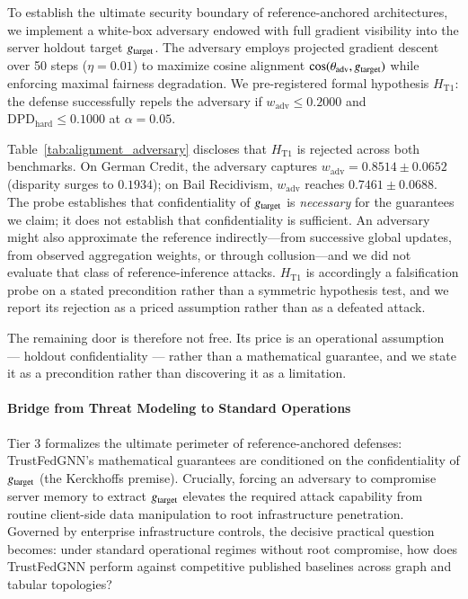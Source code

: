 To establish the ultimate security boundary of reference-anchored architectures, we implement a white-box adversary endowed with full gradient visibility into the server holdout target $g_{\mathrm{target}}$. The adversary employs projected gradient descent over 50 steps ($\eta = 0.01$) to maximize cosine alignment $\cos(\theta_{\text{adv}}, g_{\mathrm{target}})$ while enforcing maximal fairness degradation. We pre-registered formal hypothesis $H_{\text{T1}}$: the defense successfully repels the adversary if $w_{\mathrm{adv}} \le 0.2000$ and $\text{DPD}_{\text{hard}} \le 0.1000$ at $\alpha = 0.05$.

Table~\ref{tab:alignment_adversary} discloses that $H_{\text{T1}}$ is rejected across both benchmarks. On German Credit, the adversary captures $w_{\mathrm{adv}} = 0.8514 \pm 0.0652$ (disparity surges to $0.1934$); on Bail Recidivism, $w_{\mathrm{adv}}$ reaches $0.7461 \pm 0.0688$. The probe establishes that confidentiality of $g_{\mathrm{target}}$ is \emph{necessary} for the guarantees we claim; it does not establish that confidentiality is sufficient. An adversary might also approximate the reference indirectly---from successive global updates, from observed aggregation weights, or through collusion---and we did not evaluate that class of reference-inference attacks. $H_{\mathrm{T1}}$ is accordingly a falsification probe on a stated precondition rather than a symmetric hypothesis test, and we report its rejection as a priced assumption rather than as a defeated attack.

The remaining door is therefore not free. Its price is an operational assumption --- holdout confidentiality --- rather than a mathematical guarantee, and we state it as a precondition rather than discovering it as a limitation.

\paragraph{Bridge from Threat Modeling to Standard Operations}
Tier 3 formalizes the ultimate perimeter of reference-anchored defenses: TrustFedGNN's mathematical guarantees are conditioned on the confidentiality of $g_{\mathrm{target}}$ (the Kerckhoffs premise). Crucially, forcing an adversary to compromise server memory to extract $g_{\mathrm{target}}$ elevates the required attack capability from routine client-side data manipulation to root infrastructure penetration. Governed by enterprise infrastructure controls, the decisive practical question becomes: under standard operational regimes without root compromise, how does TrustFedGNN perform against competitive published baselines across graph and tabular topologies?

